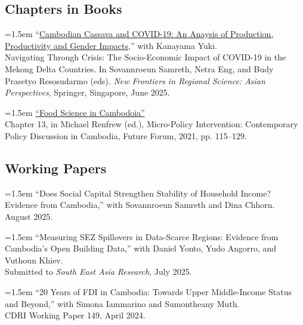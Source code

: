 \documentclass[10pt,a4paper]{article}
\begin{document}
\subsection*{Chapters in Books}

	\hangindent=1.5em
“\href{}{Cambodian Cassava and COVID-19: An Anaysis of Production, Productivity and Gender Impacts},” with Kanayama Yuki. \\
Navigating Through Crisis: The Socio-Economic Impact of COVID-19 in the Mekong Delta Countries. In Sovannroeun Samreth, Netra Eng, and Budy Prasetyo Resosudarmo (eds). \textit{New Frontiers in Regional Science: Asian Perspectives}, Springer, Singapore, June 2025. \\ \vspace{-.5em} 

\hangindent=1.5em
\href{https://kosalnith.github.io/research/policies/PolicyBrief-FST.pdf}{``Food Science in Cambodoia''} \\
Chapter 13, in Michael Renfrew (ed.), Micro-Policy Intervention: Contemporary Policy Discussion in Cambodia, Future Forum, 2021, pp. 115–129. 

\subsection*{Working Papers}

	\hangindent=1.5em
	``Does Social Capital Strengthen Stability of Household Income? Evidence from Cambodia,'' with Sovannroeun Samreth and Dina Chhorn. \\ 
	August 2025. \\ \vspace{-.5em}

	\hangindent=1.5em
	``Measuring SEZ Spillovers in Data-Scarce Regions: Evidence from Cambodia's Open Building Data,'' with Daniel Yonto, Yudo Angorro, and Vuthoun Khiev. \\
	Submitted to \textit{South East Asia Research}, July 2025. \\ \vspace{-.5em}
		

	
	\hangindent=1.5em
	``20 Years of FDI in Cambodia: Towards Upper Middle-Income Status and Beyond,'' with Simona Iammarino and Sumontheany Muth. \\
	CDRI Working Paper 149, April 2024. \\ \vspace{-.5em}
	
\end{document}
